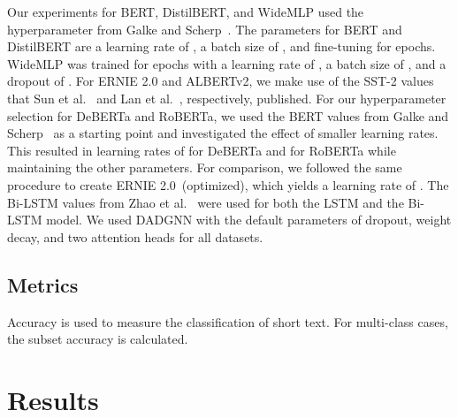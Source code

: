 \documentclass[runningheads]{llncs}
\begin{document}
Our experiments for BERT, DistilBERT, and WideMLP used the hyperparameter from Galke and Scherp~\cite{galkeMLP}.
The parameters for BERT and DistilBERT are a learning rate of , a batch size of , and fine-tuning for   epochs.
WideMLP was trained for  epochs with a learning rate of , a batch size of , and a dropout of .
For ERNIE 2.0 and ALBERTv2, we make use of the SST-2 values that Sun et al.~\cite{ERNIE} and Lan et al.~\cite{albert2019}, respectively, published.
For our hyperparameter selection for DeBERTa and RoBERTa, we used the BERT values from Galke and Scherp~\cite{galkeMLP} as a starting point and investigated the effect of smaller learning rates.
This resulted in learning rates of  for DeBERTa and  for RoBERTa while maintaining the other parameters.
For comparison, we followed the same procedure to create ERNIE 2.0~(optimized), which yields a learning rate of .
The Bi-LSTM values from Zhao et al.~\cite{zhao2021sequential} were used for both the LSTM and the Bi-LSTM model.
We used DADGNN with the default parameters of  dropout,  weight decay, and two attention heads for all datasets.

\subsection{Metrics}
\label{sec:metrics}
Accuracy is used to measure the classification of short text. 
For multi-class cases, the subset accuracy is calculated.

\section{Results}
\label{sec:results}
\end{document}
